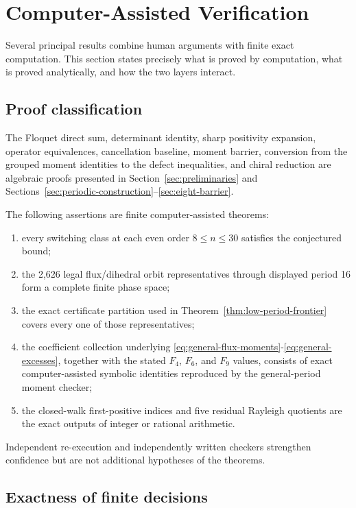 \section{Computer-Assisted Verification}\label{sec:computational-verification}

Several principal results combine human arguments with finite exact
computation. This section states precisely what is proved by computation, what
is proved analytically, and how the two layers interact.

\subsection{Proof classification}

The Floquet direct sum, determinant identity, sharp positivity expansion,
operator equivalences, cancellation baseline, moment barrier, conversion from
the grouped moment identities to the defect inequalities, and chiral reduction
are algebraic proofs presented in Section~\ref{sec:preliminaries} and
Sections~\ref{sec:periodic-construction}--\ref{sec:eight-barrier}.

The following assertions are finite computer-assisted theorems:

\begin{enumerate}
\item every switching class at each even order \(8\leq n\leq 30\) satisfies the conjectured bound;
\item the 2,626 legal flux/dihedral orbit representatives through displayed period 16 form a complete finite phase space;
\item the exact certificate partition used in Theorem~\ref{thm:low-period-frontier} covers every one of those representatives;
\item the coefficient collection underlying \eqref{eq:general-flux-moments}-\eqref{eq:general-excesses}, together with the stated \(F_{4}\), \(F_{6}\), and \(F_{9}\) values, consists of exact computer-assisted symbolic identities reproduced by the general-period moment checker;
\item the closed-walk first-positive indices and five residual Rayleigh quotients are the exact outputs of integer or rational arithmetic.
\end{enumerate}

Independent re-execution and independently written checkers strengthen
confidence but are not additional hypotheses of the theorems.

\subsection{Exactness of finite decisions}

